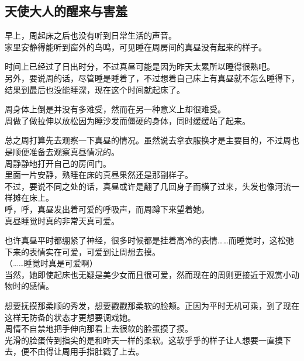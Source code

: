 \subsection{天使大人的醒来与害羞}

早上，周起床之后也没有听到日常生活的声音。\\

家里安静得能听到窗外的鸟鸣，可见睡在周房间的真昼没有起来的样子。

时间上已经过了日出时分，不过真昼可能是因为昨天太累所以睡得很熟吧。\\

另外，要说周的话，尽管睡是睡着了，不过想着自己床上有真昼就不怎么睡得下，结果到最后也没能睡深，现在这个时间就起床了。

周身体上倒是并没有多难受，然而在另一种意义上却很难受。\\

周做了做拉伸以放松因为睡沙发而僵硬的身体，同时缓缓站了起来。

总之周打算先去观察一下真昼的情况。虽然说去拿衣服换才是主要目的，不过周也是顺便准备去观察真昼情况的。\\

周静静地打开自己的房间门。\\

里面一片安静，熟睡在床的真昼果然还是那副样子。\\

不过，要说不同之处的话，真昼或许是翻了几回身子而横了过来，头发也像河流一样摊在床上。\\

呼，呼，真昼发出着可爱的呼吸声，而周蹲下来望着她。\\

真昼睡觉时真的非常天真可爱。

也许真昼平时都绷紧了神经，很多时候都是挂着高冷的表情……而睡觉时，这松弛下来的表情实在可爱，可爱到让周想去摸。\\

（……睡觉时真是可爱啊）\\

当然，她即使起床也无疑是美少女而且很可爱，然而现在的周则更接近于观赏小动物时的感情。

想要抚摸那柔顺的秀发，想要戳戳那柔软的脸颊。正因为平时无机可乘，到了现在这样无防备的状态才更想要调戏她。\\

周情不自禁地把手伸向那看上去很软的脸蛋摸了摸。\\

光滑的脸蛋传到指尖的是和昨天一样的柔软。这软乎乎的样子让人想要一直摸下去，便不由得让周用手指肚戳了上去。\\


